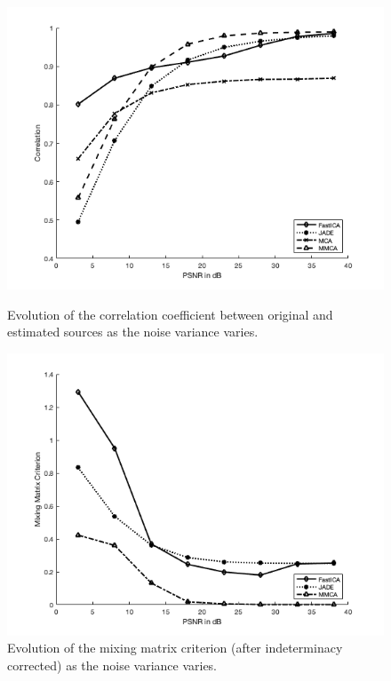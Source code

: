 \begin{figure}[!htbp]
\centering
\begin{minipage}[b]{0.49\textwidth}
\includegraphics[width=\textwidth]{images/corr_plot_seg.png}
\caption{Evolution of the correlation coefficient between original and estimated sources as the noise variance varies.}
\label{segmen_1}
\end{minipage}
\begin{minipage}[b]{0.49\textwidth}
\includegraphics[width=\textwidth]{images/mmc_plot_seg.png}
\caption{Evolution of the mixing matrix criterion (after indeterminacy corrected) as the noise variance varies.}
\end{minipage}
\label{segmen_2}
\label{imapint1}
\end{figure}

